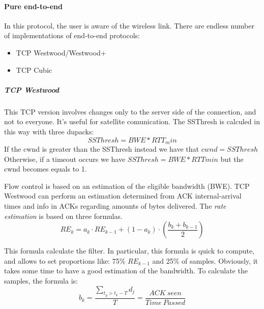 \paragraph*{Pure end-to-end} In this protocol, the user is aware of the wireless
link. There are endless number of implementations of end-to-end protocols:
\begin{itemize}
\item TCP Westwood/Westwood+
\item TCP Cubic 
\end{itemize}

\subparagraph*{TCP Westwood} This TCP version involves changes only to the
server side of the connection, and not to everyone. It's useful for satellite
comunication.
The SSThresh is calculed in this way with three dupacks:
\begin{equation}
SSThresh = BWE * RTT_min
\end{equation}
If the cwnd is greater than the SSThresh instead we have that $cwnd=SSThresh$
Otherwise, if a timeout occurs we have $SSThresh = BWE * RTTmin$ but the cwnd
becomes equals to 1.

Flow control is based on an estimation of the eligible bandwidth (BWE). TCP
Westwood can perform an estimation determined from ACK internal-arrival times
and info in ACKs regarding amounts of bytes delivered. The \textit{rate
  estimation} is based on three formulas.
\begin{equation}
  RE_k = a_k \cdot RE_{k-1} + (1 - a_k) \cdot (\frac{b_k + b_{k-1}}{2})
\end{equation}

This formula calculate the filter. In particular, this formula is quick to
compute, and allows to set proportions like: 75\% $RE_{k-1}$ and 25\% of
samples. Obviously, it takes some time to have a good estimation of the
bandwidth.
To calculate the samples, the formula is:
\begin{equation}
b_k = \frac{ \sum_{t_y > t_k-T} d_j }{T} = \frac{ACK\ seen}{Time\ Passed}
\end{equation}


